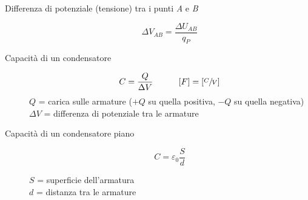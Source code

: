 \documentclass[a4paper,11pt,italian]{article}
\begin{document}
\begin{description}
  
  \item[Differenza di potenziale (tensione) tra i punti \textit{A} e \textit{B}]
  \[  \Delta V_{AB} = \frac{\Delta U_{AB}}{q_P} %
   \]
  
%   
%   
%   
%   
  
  \item[Capacità di un condensatore]
  \[ C = \frac{Q}{\Delta V} \hspace*{3em} [F] = \left[ \sfrac{C}{V} \right] \]
  $ Q $ = carica sulle armature ($ +Q $ su quella positiva, $ -Q $ su quella negativa)\\
  $ \Delta V $ = differenza di potenziale tra le armature
  
  \item[Capacità di un condensatore piano]
  \[ C = \varepsilon_0 \frac{S}{d} \]
  \begin{multicols}{2}
  $ S $ = superficie dell'armatura\\
  $ d $ = distanza tra le armature
  \end{multicols}
  

\end{description}
\end{document}
